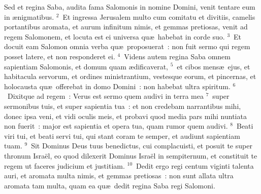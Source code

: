 \bchapter
\lettrine[lines=3,image=true,loversize=0.05,lraise=-0.03]{S}{}ed et regina Saba, audita fama Salomonis in nomine Domini, venit tentare eum in \ae nigmatibus.
${}^{2}$~Et ingressa Jerusalem multo cum comitatu et divitiis, camelis portantibus aromata, et aurum infinitum nimis, et gemmas pretiosas, venit ad regem Salomonem, et locuta est ei universa qu\ae\ habebat in corde suo.
${}^{3}$~Et docuit eam Salomon omnia verba qu\ae\ proposuerat~: non fuit sermo qui regem posset latere, et non responderet ei.
${}^{4}$~Videns autem regina Saba omnem sapientiam Salomonis, et domum quam \ae dificaverat,
${}^{5}$~et cibos mens\ae\ ejus, et habitacula servorum, et ordines ministrantium, vestesque eorum, et pincernas, et holocausta qu\ae\ offerebat in domo Domini~: non habebat ultra spiritum.
${}^{6}$~Dixitque ad regem~: Verus est sermo quem audivi in terra mea
${}^{7}$~super sermonibus tuis, et super sapientia tua~: et non credebam narrantibus mihi, donec ipsa veni, et vidi oculis meis, et probavi quod media pars mihi nuntiata non fuerit~: major est sapientia et opera tua, quam rumor quem audivi.
${}^{8}$~Beati viri tui, et beati servi tui, qui stant coram te semper, et audiunt sapientiam tuam.
${}^{9}$~Sit Dominus Deus tuus benedictus, cui complacuisti, et posuit te super thronum Isra\"el, eo quod dilexerit Dominus Isra\"el in sempiternum, et constituit te regem ut faceres judicium et justitiam.
${}^{10}$~Dedit ergo regi centum viginti talenta auri, et aromata multa nimis, et gemmas pretiosas~: non sunt allata ultra aromata tam multa, quam ea qu\ae\ dedit regina Saba regi Salomoni.


